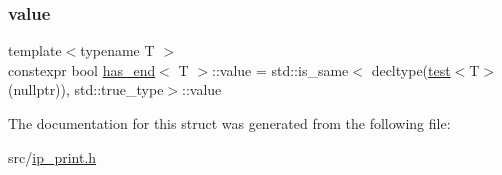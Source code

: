 \subsubsection{\texorpdfstring{value}{value}}
{\footnotesize\ttfamily template$<$typename T $>$ \\
constexpr bool \hyperlink{structhas__end}{has\+\_\+end}$<$ T $>$\+::value = std\+::is\+\_\+same$<$ decltype(\hyperlink{structhas__end_aa7f205d85237693f6d331008ca208caa}{test}$<$T$>$(nullptr)), std\+::true\+\_\+type$>$\+::value\hspace{0.3cm}{\ttfamily [static]}}



The documentation for this struct was generated from the following file\+:\begin{DoxyCompactItemize}
\item 
src/\hyperlink{ip__print_8h}{ip\+\_\+print.\+h}\end{DoxyCompactItemize}
